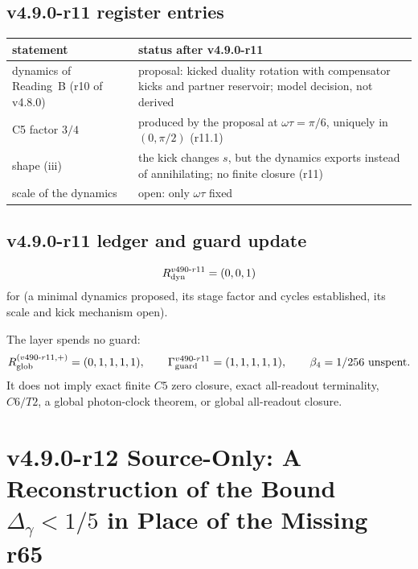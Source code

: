 \subsection*{v4.9.0-r11 register entries}
\label{subsec:v490-r11-register}

\begin{center}
\small
\begin{tabular}{@{}>{\raggedright\arraybackslash}p{}>{\raggedright\arraybackslash}p{}@{}}
\toprule
statement & status after v4.9.0-r11\\
\midrule
dynamics of Reading~B (r10 of v4.8.0) & proposal: kicked duality rotation with compensator kicks and partner reservoir; model decision, not derived\\
C5 factor \(3/4\) & produced by the proposal at \(\omega\tau=\pi/6\), uniquely in \((0,\pi/2)\) (r11.1)\\
shape (iii) & the kick changes \(s\), but the dynamics exports instead of annihilating; no finite closure (r11)\\
scale of the dynamics & open: only \(\omega\tau\) fixed\\
\bottomrule
\end{tabular}
\end{center}

\subsection*{v4.9.0-r11 ledger and guard update}
\label{subsec:v490-r11-ledger-guard}

\[
R_{\rm dyn}^{v490\text{-}r11}=(0,0,1)
\]
for (a minimal dynamics proposed, its stage factor and cycles established, its scale and kick mechanism open).

The layer spends no guard:
\[
R_{\rm glob}^{(v490\text{-}r11,+)}=(0,1,1,1,1),
\qquad
\Gamma_{\rm guard}^{v490\text{-}r11}=(1,1,1,1,1),
\qquad
\beta_4=1/256\ \text{unspent}.
\]
It does not imply exact finite \(C5\) zero closure, exact all-readout terminality,
\(C6/T2\), a global photon-clock theorem, or global all-readout closure.

\clearpage
\section*{v4.9.0-r12 Source-Only: A Reconstruction of the Bound \texorpdfstring{\(\Delta_\gamma<1/5\)}{Delta gamma < 1/5} in Place of the Missing r65}
\label{sec:v490-r12-delta-gamma-reconstruction}

